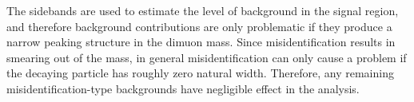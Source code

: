 The sidebands are used to estimate the level of background in the signal region, and therefore
background
contributions are only problematic if they produce a narrow peaking structure in the dimuon mass.
Since misidentification results in smearing out of the mass, in general misidentification can only cause a problem if the decaying particle has roughly zero natural width.
Therefore, any remaining misidentification-type backgrounds have negligible effect in the analysis.






